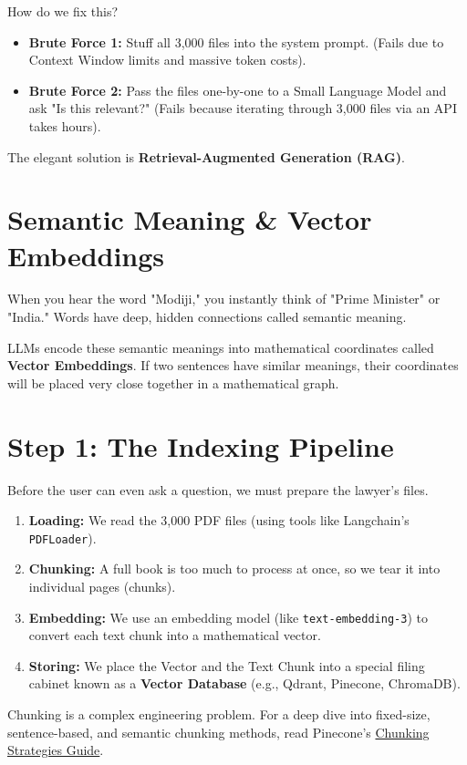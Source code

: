 \documentclass[12pt,a4paper,oneside]{book}
\begin{document}
How do we fix this?
\begin{itemize}
	\item \textbf{Brute Force 1:} Stuff all 3,000 files into the system prompt. (Fails due to Context Window limits and massive token costs).
	\item \textbf{Brute Force 2:} Pass the files one-by-one to a Small Language Model and ask "Is this relevant?" (Fails because iterating through 3,000 files via an API takes hours).
\end{itemize}
The elegant solution is \textbf{Retrieval-Augmented Generation (RAG)}.

\section{Semantic Meaning \& Vector Embeddings}
When you hear the word "Modiji," you instantly think of "Prime Minister" or "India." Words have deep, hidden connections called semantic meaning.

LLMs encode these semantic meanings into mathematical coordinates called \textbf{Vector Embeddings}. If two sentences have similar meanings, their coordinates will be placed very close together in a mathematical graph.

\section{Step 1: The Indexing Pipeline}
Before the user can even ask a question, we must prepare the lawyer's files.
\begin{enumerate}
	\item \textbf{Loading:} We read the 3,000 PDF files (using tools like Langchain's \texttt{PDFLoader}).
	\item \textbf{Chunking:} A full book is too much to process at once, so we tear it into individual pages (chunks).
	\item \textbf{Embedding:} We use an embedding model (like \texttt{text-embedding-3}) to convert each text chunk into a mathematical vector.
	\item \textbf{Storing:} We place the Vector and the Text Chunk into a special filing cabinet known as a \textbf{Vector Database} (e.g., Qdrant, Pinecone, ChromaDB).
\end{enumerate}

\begin{tipbox}
	Chunking is a complex engineering problem. For a deep dive into fixed-size, sentence-based, and semantic chunking methods, read Pinecone's \href{https://www.pinecone.io/learn/chunking-strategies/}{Chunking Strategies Guide}.
\end{tipbox}
\end{document}
